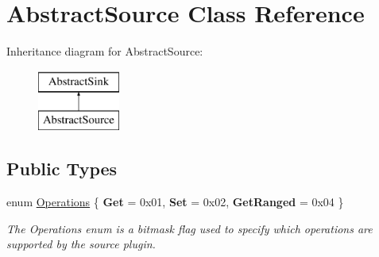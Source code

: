 \hypertarget{classAbstractSource}{\section{Abstract\-Source Class Reference}
\label{classAbstractSource}
}
Inheritance diagram for Abstract\-Source\-:\begin{figure}[H]
\begin{center}
\leavevmode
\includegraphics[height=2.000000cm]{classAbstractSource}
\end{center}
\end{figure}
\subsection*{Public Types}
\begin{DoxyCompactItemize}
\item 
enum \hyperlink{classAbstractSource_aad1e5e4914f2aa174dfd8fa6e143c1b9}{Operations} \{ {\bfseries Get} = 0x01, 
{\bfseries Set} = 0x02, 
{\bfseries Get\-Ranged} = 0x04
 \}
\begin{DoxyCompactList}\small\item\em The Operations enum is a bitmask flag used to specify which operations are supported by the source plugin. \end{DoxyCompactList}\end{DoxyCompactItemize}
